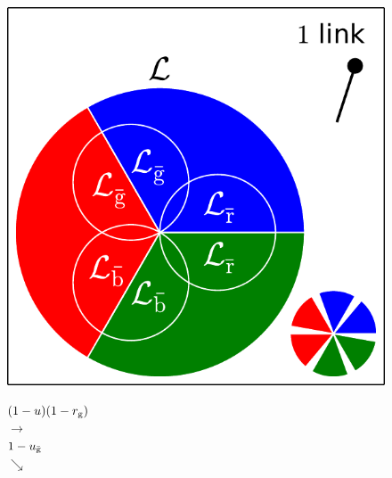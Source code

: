 \documentclass[aps, pre, onecolumn, a4paper, floatfix]{revtex4}
\begin{document}
\begin{figure}[htb]
  \begin{minipage}[b]{0.2\linewidth}
    \begin{center}
    \includegraphics[width=0.99\columnwidth]{sets_1_all.pdf}\\
      \vspace{42mm}
   \end{center}
  \end{minipage}
  \begin{minipage}[b]{0.15\linewidth}
    \begin{center}
      $(1-u)(1-r_{\rm g})$\\
      {\large $\rightarrow$\\}
      \vspace{20mm}
      $1-u_{\bar{\rm g}}$\\
      {\large $\searrow$\\}
      \vspace{27mm}
    \end{center}
  \end{minipage}
  \begin{minipage}[b]{0.2\linewidth}
    \begin{center}

\end{center}
\end{minipage}
\end{figure}
\end{document}

